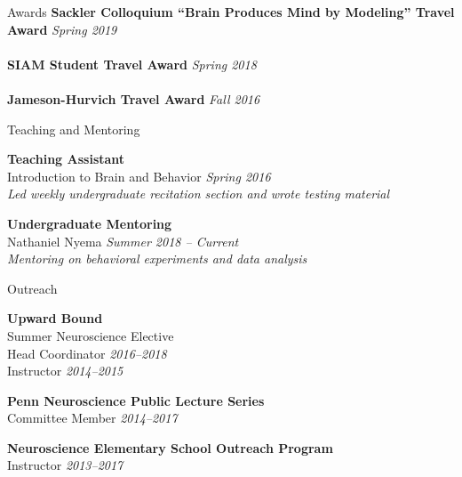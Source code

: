 \documentclass{resume} %
\begin{document}
\begin{rSection}{Awards}
    \textbf{Sackler Colloquium ``Brain Produces Mind by Modeling'' Travel Award} \hfill \emph{Spring 2019} \\
    \\
    \textbf{SIAM Student Travel Award} \hfill \emph{Spring 2018} \\
    \\
    \textbf{Jameson-Hurvich Travel Award} \hfill \emph{Fall 2016} \\
\end{rSection}


\begin{rSection}{Teaching and Mentoring}

\textbf{Teaching Assistant} \\
Introduction to Brain and Behavior \hfill \emph{Spring 2016} \\
\emph{Led weekly undergraduate recitation section and wrote testing material}

\textbf{Undergraduate Mentoring} \\
Nathaniel Nyema \hfill \emph{Summer 2018 -- Current} \\
\emph{Mentoring on behavioral experiments and data analysis}
\end{rSection}


\begin{rSection}{Outreach}

\textbf{Upward Bound}\\
Summer Neuroscience Elective \\
Head Coordinator \hfill \emph{2016--2018} \\
Instructor \hfill \emph{2014--2015}

\textbf{Penn Neuroscience Public Lecture Series}\\
Committee Member \hfill \emph{2014--2017}

\textbf{Neuroscience Elementary School Outreach Program}\\
Instructor \hfill \emph{2013--2017}

\end{rSection}
\end{document}
